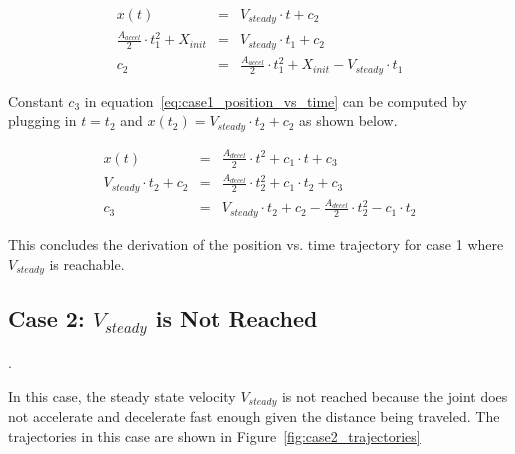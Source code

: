 \documentclass[11pt]{article} %
\begin{document}
\begin{eqnarray}
x(t) & = & V_{steady} \cdot t + c_2 \nonumber \\
 \frac{A_{accel}}{2} \cdot t_1^2 + X_{init} & = & V_{steady} \cdot t_1 + c_2 \nonumber\\
 c_2 & = &   \frac{A_{accel}}{2} \cdot t_1^2 + X_{init} - V_{steady} \cdot t_1
 \end{eqnarray}

\noindent Constant $c_3$ in equation~\ref{eq:case1_position_vs_time} can be computed by plugging in $t = t_2$ and $x(t_2) = V_{steady} \cdot t_2 + c_2$ as shown below.

\begin{eqnarray}
x(t) & = & \frac{A_{decel}}{2} \cdot t^{2} + c_1 \cdot t + c_3 \nonumber \\
V_{steady} \cdot t_2 + c_2 & = & \frac{A_{decel}}{2} \cdot t_2^2 + c_1 \cdot t_2 + c_3 \nonumber \\
 c_3 & = & V_{steady} \cdot t_2 + c_2 - \frac{A_{decel}}{2} \cdot t_2^2 - c_1 \cdot t_2
  \end{eqnarray}

\noindent This concludes the derivation of the position vs. time trajectory for case 1 where $V_{steady}$ is reachable.

\subsection{Case 2: $V_{steady}$ is Not Reached} \label{sec:unable_to_reach_V_steady}.

In this case, the steady state velocity $V_{steady}$ is not reached because the joint does not accelerate and decelerate fast enough given the distance being traveled. The trajectories in this case are shown in Figure~\ref{fig:case2_trajectories}
\end{document}
